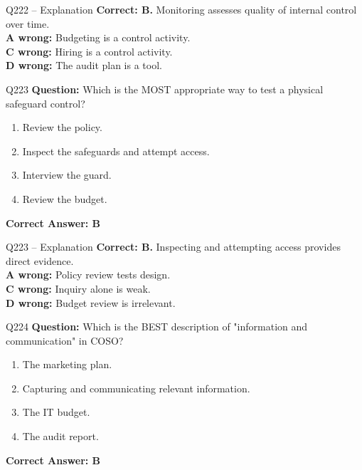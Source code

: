 \documentclass[aspectratio=169,10pt]{beamer}
\begin{document}
	\begin{frame}[t]{Q222 -- Explanation}
		\small
		\textbf{Correct: B.} Monitoring assesses quality of internal control over time. \\[4pt]
		\textbf{A wrong:} Budgeting is a control activity. \\[2pt]
		\textbf{C wrong:} Hiring is a control activity. \\[2pt]
		\textbf{D wrong:} The audit plan is a tool.
	\end{frame}
	
	\begin{frame}[t]{Q223}
		\small
		\textbf{Question:} Which is the MOST appropriate way to test a physical safeguard control?
		\begin{enumerate}[label=\Alph*.,itemsep=1pt,topsep=2pt]
			\item Review the policy.
			\item Inspect the safeguards and attempt access.
			\item Interview the guard.
			\item Review the budget.
		\end{enumerate}
		\vspace{4pt}
		\textbf{Correct Answer: B}
	\end{frame}
	
	\begin{frame}[t]{Q223 -- Explanation}
		\small
		\textbf{Correct: B.} Inspecting and attempting access provides direct evidence. \\[4pt]
		\textbf{A wrong:} Policy review tests design. \\[2pt]
		\textbf{C wrong:} Inquiry alone is weak. \\[2pt]
		\textbf{D wrong:} Budget review is irrelevant.
	\end{frame}
	
	\begin{frame}[t]{Q224}
		\small
		\textbf{Question:} Which is the BEST description of "information and communication" in COSO?
		\begin{enumerate}[label=\Alph*.,itemsep=1pt,topsep=2pt]
			\item The marketing plan.
			\item Capturing and communicating relevant information.
			\item The IT budget.
			\item The audit report.
		\end{enumerate}
		\vspace{4pt}
		\textbf{Correct Answer: B}
	\end{frame}
	
\end{document}
